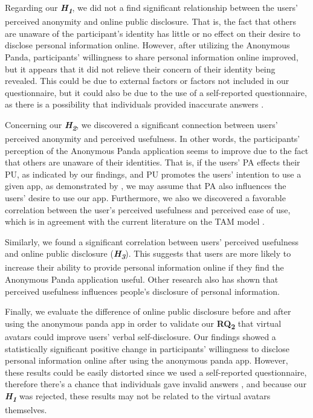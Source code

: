 Regarding our \textbf{\textit{H\textsubscript{1}}}, we did not a find significant relationship between the users' perceived anonymity and online public disclosure. That is, the fact that others are unaware of the participant's identity has little or no effect on their desire to disclose personal information online. However, after utilizing the Anonymous Panda, participants' willingness to share personal information online improved, but it appears that it did not relieve their concern of their identity being revealed. This could be due to external factors or factors not included in our questionnaire, but it could also be due to the use of a self-reported questionnaire, as there is a possibility that individuals provided inaccurate answers \cite{DEM15}.

Concerning our \textbf{\textit{H\textsubscript{2}}}, we discovered a significant connection between users' perceived anonymity and perceived usefulness. In other words, the participants' perception of the Anonymous Panda application seems to improve due to the fact that others are unaware of their identities. That is, if the users' PA effects their PU, as indicated by our findings, and PU promotes the users' intention to use a given app, as demonstrated by \cite{DAV89}, we may assume that PA also influences the users' desire to use our app. Furthermore, we also we discovered a favorable correlation between the user's perceived usefulness and perceived ease of use, which is in agreement with the current literature on the TAM model \cite{DAV89}.

Similarly, we found a significant correlation between users' perceived usefulness and online public disclosure (\textbf{\textit{H\textsubscript{3}}}). This suggests that users are more likely to increase their ability to provide personal information online if they find the Anonymous Panda application useful. Other research \cite{ZHO18, SHA21} also has shown that perceived usefulness influences people's disclosure of personal information.

Finally, we evaluate the difference of online public disclosure before and after using the anonymous panda app in order to validate our \textbf{RQ\textsubscript{2}} that virtual avatars could improve users' verbal self-disclosure. Our findings showed a statistically significant positive change in participants' willingness to disclose personal information online after using the anonymous panda app. However, these results could be easily distorted since we used a self-reported questionnaire, therefore there's a chance that individuals gave invalid answers \cite{DEM15}, and because our \textbf{\textit{H\textsubscript{1}}} was rejected, these results may not be related to the virtual avatars themselves.

